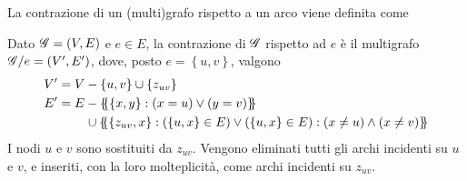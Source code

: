 La contrazione di un (multi)grafo rispetto a un arco viene definita come
\begin{definition}
    [Contrazione]
    \label{def:contrazione}
    Dato $
    \mathscr{G}{} = \left( V, E \right)
    $ e $
    e \in E
    $, la contrazione di $
    \mathscr{G}{}
    $ rispetto ad $e$ è il multigrafo $
    \mathscr{G}{} / e = \left( V', E' \right)
    $, dove, posto $
    e =
    \left\{ u, v \right\}
    $, valgono
    \begin{align*}
        V'
        &
        = 
        V
        -
        \left\{ u, v \right\}
        \cup
        \left\{
            z_{uv}
        \right\}
        \\
        E'
        &
        = 
        E 
        \begin{aligned}[t]
            &
            -
            \{\mskip-5mu\{
                \left\{ x, y \right\}
                :
                \left( x = u \right)
                \vee
                \left( y = v \right)
            \}\mskip-5mu\}
            \\
            &
            \mskip1mu
            \cup
            \{\mskip-5mu\{
                \left\{ z_{uv}, x \right\}
                :
                \left( \left\{ u,x \right\} \in E \right)
                \vee
                \left( \left\{ u,x \right\} \in E \right)
                :
                \left( x \ne u \right)
                \wedge
                \left( x \ne v \right)
            \}\mskip-5mu\}
        \end{aligned}
    \end{align*}
    I nodi $u$ e $v$ sono sostituiti da $
    z_{uv}
    $.
    Vengono eliminati tutti gli archi incidenti su $u$ e $v$, e inseriti, con la loro molteplicità, come archi incidenti su $
    z_{uv}
    $.
\end{definition}

